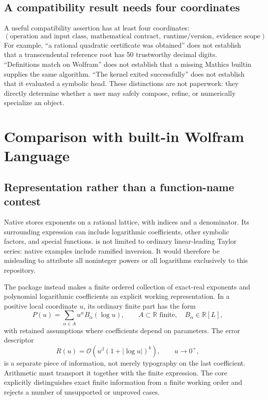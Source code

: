 \documentclass[11pt,letterpaper]{article}
\newcommand{\code}[1]{\texttt{\detokenize{#1}}}
\newcommand{\Oa}{\mathcal O}
\newcommand{\R}{\mathbb R}
\begin{document}
\subsection{A compatibility result needs four coordinates}

A useful compatibility assertion has at least four coordinates:
\[
 (\text{operation and input class},\ \text{mathematical contract},\
   \text{runtime/version},\ \text{evidence scope}).
\]
For example, ``a rational quadratic certificate was obtained'' does not establish that a transcendental reference root has 50 trustworthy decimal digits. ``Definitions match on Wolfram'' does not establish that a missing Mathics builtin supplies the same algorithm. ``The kernel exited successfully'' does not establish that it evaluated a symbolic head. These distinctions are not paperwork: they directly determine whether a user may safely compose, refine, or numerically specialize an object.

\section{Comparison with built-in Wolfram Language}
\subsection{Representation rather than a function-name contest}

Native \code{SeriesData} stores exponents on a rational lattice, with indices and a denominator. Its surrounding expression can include logarithmic coefficients, other symbolic factors, and special functions. \code{InverseSeries} is not limited to ordinary linear-leading Taylor series: native examples include ramified inversion. It would therefore be misleading to attribute all noninteger powers or all logarithms exclusively to this repository.\cite{wl-seriesdata,wl-inverseseries}

The package instead makes a finite ordered collection of exact-real exponents and polynomial logarithmic coefficients an explicit working representation. In a positive local coordinate $u$, its ordinary finite part has the form
\begin{equation}\label{eq:jet}
 P(u)=\sum_{\alpha\in A}u^\alpha B_\alpha(\log u),
 \qquad A\subset\R\text{ finite},\quad B_\alpha\in\R[L],
\end{equation}
with retained assumptions where coefficients depend on parameters. The error descriptor
\begin{equation}\label{eq:error}
 R(u)=\Oa\!\left(u^\beta(1+|\log u|)^k\right),\qquad u\to0^+,
\end{equation}
is a separate piece of information, not merely typography on the last coefficient. Arithmetic must transport it together with the finite expression. The core explicitly distinguishes exact finite information from a finite working order and rejects a number of unsupported or unproved cases.\cite{core}
\end{document}
